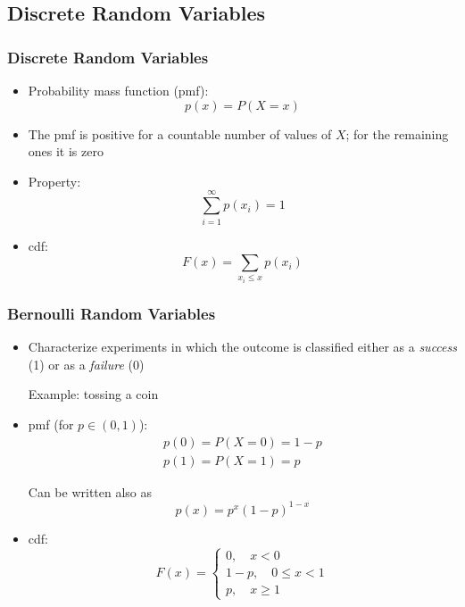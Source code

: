 \documentclass[10pt]{beamer}
\theoremstyle{definition}
\begin{document}
\subsection{Discrete Random Variables}
\begin{frame}[fragile]
\frametitle{Discrete Random Variables}
\begin{itemize}
	\item Probability mass function (pmf):
	\[
		p(x)  = P(X = x)
	\]
		
	\item The pmf is positive for a countable number of values of $ X $; for the remaining ones it is zero
		
	\item Property:
	\[
		\sum_{i = 1}^{\infty}p(x_{i}) = 1
	\]
		
	\item cdf:
	\[
		F(x) = \sum_{x_{i} \leq x} p(x_{i})
	\]
\end{itemize}
\end{frame}

\begin{frame}[fragile]
\frametitle{Bernoulli Random Variables}
\begin{itemize}
	\item Characterize experiments in which the outcome is classified either as a \textit{success} (1) or as a \textit{failure} (0)
		
	\color{blue}
	Example: tossing a coin
		
	\color{black}
	\item pmf (for $ p \in (0,1) $):
	\[
		\begin{array}{lcl}
			p(0) = P(X = 0) = 1 - p\\
			p(1) = P(X = 1) = p
		\end{array}
	\]
		
	Can be written also as
	\[
		p(x) = p^{x}(1-p)^{1-x}
	\]
		
	\item cdf:
	\[
		F(x) = 
		\left\{
		\begin{array}{lcl}
			0, \quad x < 0\\
			1 - p, \quad 0 \leq x < 1\\
			p, \quad x \geq 1
		\end{array}
	\right.
	\]	
\end{itemize}
\end{frame}
\end{document}
